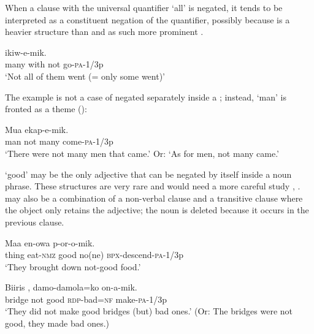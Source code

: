 When a clause with the universal quantifier  `all' is negated, it tends to be interpreted as a constituent negation of the quantifier, possibly because  is a heavier structure than  and as such more prominent .

\ea%
\label{ex:6:x668}
\gll {}      ikiw-e-mik. \\
many  with  not  go-\textsc{pa}-1/3p\\
\glt `Not all of them went (= only some went)'
\z

The example  is not a case of  negated separately inside a ; instead,  `man' is fronted as a theme ():

\ea%
\label{ex:6:x1150}
\gll Mua      ekap-e-mik. \\
man  not  many  come-\textsc{pa}-1/3p\\
\glt `There were not many men that came.' Or: `As for men, not many came.'
\z

 `good' may be the only adjective that can be negated by itself inside a noun phrase. These structures are very rare and would need a more careful study , .  may also be a combination of a non-verbal clause and a transitive clause where the object  only retains the adjective; the noun is deleted because it occurs in the previous clause.

\ea%
\label{ex:6:x1106}
\gll Maa  en-owa      p-or-o-mik. \\
thing  eat-\textsc{nmz}  good  no(ne)  \textsc{bpx}-descend-\textsc{pa}-1/3p\\
\glt `They brought down not-good food.'
\z

\ea%
\label{ex:6:x1107}
\gll Biiris    ,  damo-damola=ko  on-a-mik. \\
bridge  not  good  \textsc{rdp}-bad=\textsc{nf}  make-\textsc{pa}-1/3p\\
\glt `They did not make good bridges (but) bad ones.' (Or: The bridges were not good, they made bad ones.) 
\z

